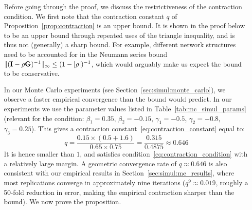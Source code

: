 Before going through the proof, we discuss the restrictiveness of the contraction condition. We first note that the contraction constant $q$ of Proposition~\ref{prop:contraction} is an upper bound. It is shown in the proof below to be an upper bound through repeated uses of the triangle inequality, and is thus not (generally) a sharp bound. For example, different network structures need to be accounted for in the Neumann series bound $\|(\mathbf{I} - \rho\mathbf{G})^{-1}\|_\infty \leq (1-|\rho|)^{-1}$, which would arguably make us expect the bound to be conservative.

In our Monte Carlo experiments (see Section~\ref{sec:simul:monte_carlo}), we observe a faster empirical convergence than the bound would predict. In our experiments we use the parameter values listed in Table~\ref{tab:mc_simul_params} (relevant for the condition: $\beta_1 = 0.35$, $\beta_2 = -0.15$, $\gamma_1 = -0.5$, $\gamma_2 = -0.8$, $\gamma_3 = 0.25$). This gives a contraction constant~\eqref{eq:contraction_constant} equal to:
\begin{equation}
    q = \frac{0.15 \times (0.5 + 1.6)}{0.65 \times 0.75} = \frac{0.315}{0.4875} \approx 0.646
\end{equation}
It is hence smaller than $1$, and satisfies condition~\eqref{eq:contraction_condition} with a relatively large margin. A geometric convergence rate of $q \approx 0.646$ is also consistent with our empirical results in Section~\ref{sec:simul:mc_results}, where most replications converge in approximately nine iterations ($q^9 \approx 0.019$, roughly a 50-fold reduction in error, making the empirical contraction sharper than the bound). We now prove the proposition.

